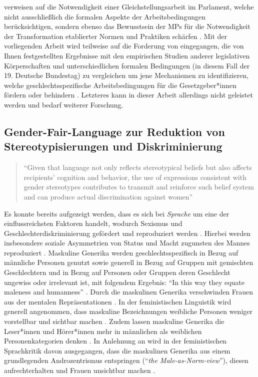 \documentclass[12pt, 
    twoside=false, 
    bibliography=totoc, 
    numbers=endperiod, 
    headings=normal, 
    toc=chapterentrydotfill
    ]{scrbook}
\begin{document}
\citeauthor{erikson_2018} verweisen auf die Notwendigkeit einer Gleichstellungsarbeit im Parlament, welche nicht ausschließlich die formalen Aspekte der Arbeitsbedingungen berücksichtigen, sondern ebenso das Bewusstsein der MPs für die Notwendigkeit der Transformation etablierter Normen und Praktiken schärfen \parencite[211]{erikson_2018}.
Mit der vorliegenden Arbeit wird teilweise auf die Forderung von \citeauthor{erikson_2018} eingegangen, die von Ihnen festgestellten Ergebnisse mit den empirischen Studien anderer legislativen Körperschaften und unterschiedlichen formalen Bedingungen (in diesem Fall der 19. Deutsche Bundestag) zu vergleichen um jene Mechanismen zu identifizieren, welche geschlechtsspezifische Arbeitsbedingungen für die Gesetzgeber*innen fördern oder behindern \parencite[211]{erikson_2018}. Letzteres kann in dieser Arbeit allerdings nicht geleistet werden und bedarf weiterer Forschung. 

\subsection{Gender-Fair-Language zur Reduktion von Stereotypisierungen und Diskriminierung}\label{kapitel:gfl-studien}

\citereset
\begin{quote}
    \enquote{Given that language not only reflects stereotypical beliefs but also affects recipients’ cognition and behavior, the use of expressions consistent with gender stereotypes contributes to transmit and reinforce such belief system and can produce actual discrimination against women} \parencite[2]{menegatti_2017}
\end{quote}

Es konnte bereits aufgezeigt werden, dass es sich bei \emph{Sprache} um eine der einflussreichsten Faktoren handelt, wodurch Sexismus und Geschlechterdiskriminierung gefördert und reproduziert werden \parencite*[1]{menegatti_2017}. Hierbei werden insbesondere soziale Asymmetrien von Status und Macht zugunsten des Mannes reproduziert \parencite{menegatti_2017}.
Maskuline Generika werden geschlechtsspezifisch in Bezug auf männliche Personen genutzt sowie generell in Bezug auf Gruppen mit gemischten Geschlechtern und in Bezug auf Personen oder Gruppen deren Geschlecht ungewiss oder irrelevant ist, mit folgendem Ergebnis: \enquote{In this way they equate maleness and humanness} \parencite[169]{stahlberg_2007}. Durch die maskulinen Generika verschwinden Frauen aus der mentalen Repräsentationen \parencites{vaughan_2018}{stahlberg_2001}. In der feministischen Linguistik wird generell angenommen, dass maskuline Bezeichnungen weibliche Personen weniger vorstellbar und sichtbar machen \parencite[131]{stahlberg_2001}. Zudem lassen maskuline Generika die Leser*innen und Hörer*innen mehr in männlichen als weiblichen Personenkategorien denken \parencites[2]{sczesny_2016}{stahlberg_2007}. In Anlehnung an \textcite{stahlberg_2007} wird in der feministischen Sprachkritik davon ausgegangen, dass die maskulinen Generika aus einem grundlegenden Androzentrismus entspringen (\enquote{\emph{the Male-as-Norm-view}}), diesen aufrechterhalten und Frauen unsichtbar machen \parencites[170]{stahlberg_2007}{miller_1976}{silveira_1980}.
\end{document}
